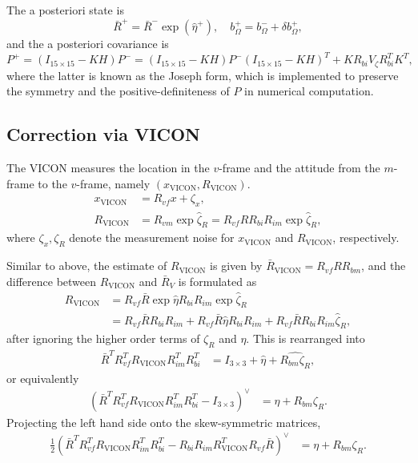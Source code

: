 \documentclass[11pt]{article}
\begin{document}
The a posteriori state is
\begin{equation}
\bar R^+ =\bar R^- \exp(\hat \eta^+),
\quad 
b_\Omega^+=b_\Omega^- + \delta b_\Omega^+,
\end{equation}
and the a posteriori covariance is
\begin{equation}
P^+ = (I_{15\times 15}-KH)P^-= (I_{15\times 15}-KH)P^-(I_{15\times 15}-KH)^T + K R_{bi} V_\zeta R_{bi}^T K^T,
\end{equation}
where the latter is known as the Joseph form, which is implemented to preserve the symmetry and the positive-definiteness of $P$ in numerical computation.


\newcommand{\V}{\mathrm{VICON}}

\subsection{Correction via VICON}

The VICON measures the location in the $v$-frame and the attitude from the $m$-frame to the $v$-frame, namely $(x_\V, R_\V)$.
\begin{align*}
x_\V &= R_{vf} x + \zeta_x,\\
R_\V &= R_{vm}\exp\hat\zeta_R = R_{vf} R R_{bi}R_{im}\exp\hat\zeta_R,
\end{align*}
where $\zeta_x,\zeta_R$ denote the measurement noise for $x_\V$ and $R_\V$, respectively. 

Similar to above, the estimate of $R_\V$ is given by $\bar R_\V =R_{vf} R R_{bm}$, and the difference between $R_\V$ and $\bar R_V$ is formulated as
\begin{align*}
R_\V & = R_{vf} \bar R \exp\hat\eta R_{bi}R_{im}\exp\hat\zeta_R\\
& = R_{vf} \bar R R_{bi}R_{im}
+R_{vf} \bar R \hat\eta R_{bi}R_{im}
+R_{vf} \bar R R_{bi}R_{im}\hat\zeta_R,
\end{align*}
after ignoring the higher order terms of $\zeta_R$ and $\eta$. This is rearranged into
\begin{align*}
\bar R^T R_{vf}^T R_\V R_{im}^T R_{bi}^T 
& =  I_{3\times 3}
+ \hat\eta 
+ \widehat{R_{bm}\zeta_R},
\end{align*}
or equivalently
\begin{align*}
(\bar R^T R_{vf}^T R_\V R_{im}^T R_{bi}^T  -I_{3\times 3})^\vee
& =  \eta +R_{bm}\zeta_R.
\end{align*}
Projecting the left hand side onto the skew-symmetric matrices,
\begin{align*}
\frac{1}{2}(\bar R^T R_{vf}^T R_\V R_{im}^T R_{bi}^T  -R_{bi}R_{im} R_\V^T R_{vf}\bar R)^\vee
& =  \eta +R_{bm}\zeta_R.
\end{align*}
\end{document}
